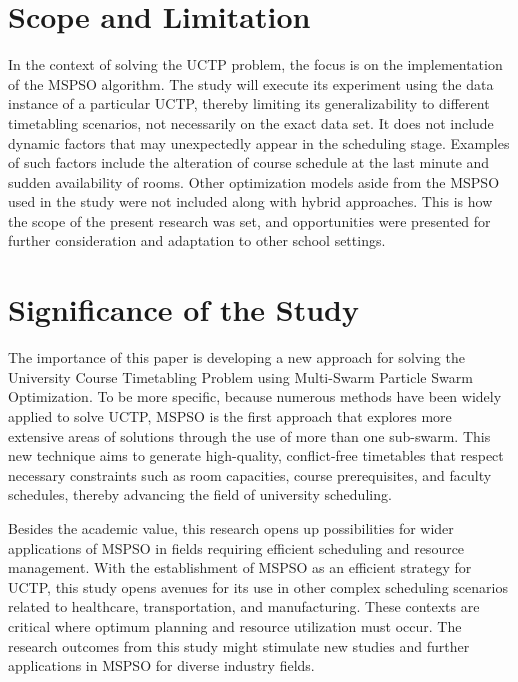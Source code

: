 \documentclass{article}
\begin{document}
\section{Scope and Limitation}
\label{sec:scopeandlimitation}

In the context of solving the UCTP problem, the focus is on the implementation of the MSPSO algorithm. The study will execute its experiment using the data instance of a particular UCTP, thereby limiting its generalizability to different timetabling scenarios, not necessarily on the exact data set. It does not include dynamic factors that may unexpectedly appear in the scheduling stage. Examples of such factors include the alteration of course schedule at the last minute and sudden availability of rooms. Other optimization models aside from the MSPSO used in the study were not included along with hybrid approaches. This is how the scope of the present research was set, and opportunities were presented for further consideration and adaptation to other school settings.

\section{Significance of the Study}
\label{sec:significance}

The importance of this paper is developing a new approach for solving the University Course Timetabling Problem using Multi-Swarm Particle Swarm Optimization. To be more specific, because numerous methods have been widely applied to solve UCTP, MSPSO is the first approach that explores more extensive areas of solutions through the use of more than one sub-swarm. This new technique aims to generate high-quality, conflict-free timetables that respect necessary constraints such as room capacities, course prerequisites, and faculty schedules, thereby advancing the field of university scheduling.

Besides the academic value, this research opens up possibilities for wider applications of MSPSO in fields requiring efficient scheduling and resource management. With the establishment of MSPSO as an efficient strategy for UCTP, this study opens avenues for its use in other complex scheduling scenarios related to healthcare, transportation, and manufacturing. These contexts are critical where optimum planning and resource utilization must occur. The research outcomes from this study might stimulate new studies and further applications in MSPSO for diverse industry fields.
\end{document}
